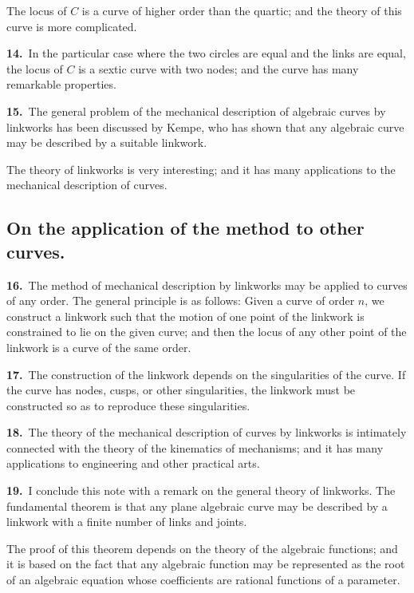 \documentclass[11pt,a4paper]{article}
\begin{document}
The locus of $C$ is a curve of higher order than the quartic; and the theory of this curve is more complicated.

\textbf{14.}\ In the particular case where the two circles are equal and the links are equal, the locus of $C$ is a sextic curve with two nodes; and the curve has many remarkable properties.

\textbf{15.}\ The general problem of the mechanical description of algebraic curves by linkworks has been discussed by Kempe, who has shown that any algebraic curve may be described by a suitable linkwork.

The theory of linkworks is very interesting; and it has many applications to the mechanical description of curves.

\subsection*{On the application of the method to other curves.}

\textbf{16.}\ The method of mechanical description by linkworks may be applied to curves of any order. The general principle is as follows: Given a curve of order $n$, we construct a linkwork such that the motion of one point of the linkwork is constrained to lie on the given curve; and then the locus of any other point of the linkwork is a curve of the same order.

\textbf{17.}\ The construction of the linkwork depends on the singularities of the curve. If the curve has nodes, cusps, or other singularities, the linkwork must be constructed so as to reproduce these singularities.

\textbf{18.}\ The theory of the mechanical description of curves by linkworks is intimately connected with the theory of the kinematics of mechanisms; and it has many applications to engineering and other practical arts.

\newpage
\setcounter{page}{188}

\noindent\textbf{19.}\ I conclude this note with a remark on the general theory of linkworks. The fundamental theorem is that any plane algebraic curve may be described by a linkwork with a finite number of links and joints.

The proof of this theorem depends on the theory of the algebraic functions; and it is based on the fact that any algebraic function may be represented as the root of an algebraic equation whose coefficients are rational functions of a parameter.
\end{document}
